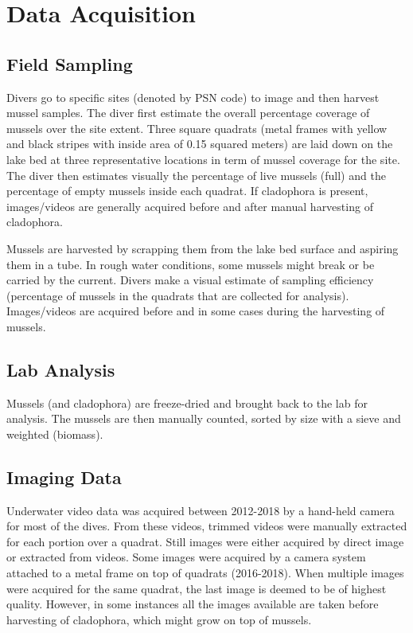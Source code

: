 \documentclass[11pt]{article} %
\begin{document}
\section{Data Acquisition}

\subsection{Field Sampling}

Divers go to specific sites (denoted by PSN code) to image and then harvest mussel samples. The diver first estimate the overall percentage coverage of mussels over the site extent. Three square quadrats (metal frames with yellow and black stripes with inside area of 0.15 squared meters) are laid down on the lake bed at three representative locations in term of mussel coverage for the site. The diver then estimates visually the percentage of live mussels (full) and the percentage of empty mussels inside each quadrat. If cladophora is present, images/videos are generally acquired before and after manual harvesting of cladophora.

Mussels are harvested by scrapping them from the lake bed surface and aspiring them in a tube. In rough water conditions, some mussels might break or be carried by the current. Divers make a visual estimate of sampling efficiency (percentage of mussels in the quadrats that are collected for analysis). Images/videos are acquired before and in some cases during the harvesting of mussels.

\subsection{Lab Analysis}
Mussels (and cladophora) are freeze-dried and brought back to the lab for analysis. The mussels are then manually counted, sorted by size with a sieve and weighted (biomass).

\subsection{Imaging Data}
Underwater video data was acquired between 2012-2018 by a hand-held camera for most of the dives. From these videos, trimmed videos were manually extracted for each portion over a quadrat. Still images were either acquired by direct image or extracted from videos. Some images were acquired by a camera system attached to a metal frame on top of quadrats (2016-2018). When multiple images were acquired for the same quadrat, the last image is deemed to be of highest quality. However, in some instances all the images available are taken before harvesting of cladophora, which might grow on top of mussels.
\end{document}
